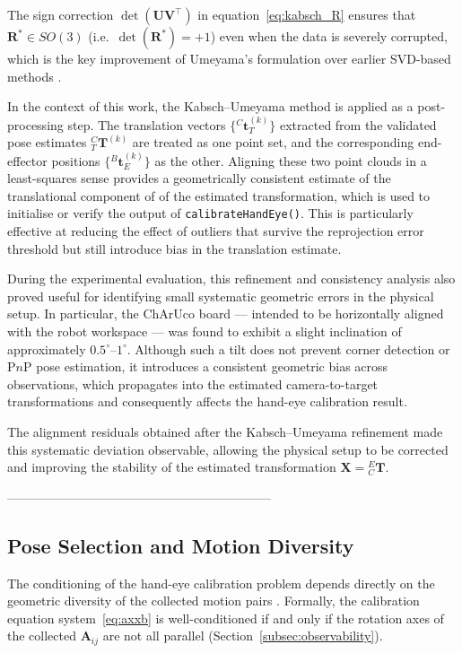 \noindent The sign correction $\det(\mathbf{U}\mathbf{V}^{\top})$ in
equation~\eqref{eq:kabsch_R} ensures that $\mathbf{R}^* \in SO(3)$ (i.e.\
$\det(\mathbf{R}^*) = +1$) even when the data is severely corrupted, which
is the key improvement of Umeyama's formulation over earlier SVD-based methods
\cite{umeyama1991least}.

In the context of this work, the Kabsch--Umeyama method is applied as a
post-processing step. The translation vectors
$\{{}^C\mathbf{t}_T^{(k)}\}$ extracted from the validated pose estimates
${}^C_T\mathbf{T}^{(k)}$ are treated as one point set, and the corresponding
end-effector positions $\{{}^B\mathbf{t}_E^{(k)}\}$ as the other. Aligning
these two point clouds in a least-squares sense provides a geometrically
consistent estimate of the translational component of of the estimated transformation, which
is used to initialise or verify the output of \texttt{calibrateHandEye()}.
This is particularly effective at reducing the effect of outliers that survive
the reprojection error threshold but still introduce bias in the translation
estimate.


During the experimental evaluation, this refinement and consistency analysis
also proved useful for identifying small systematic geometric errors in the
physical setup. In particular, the ChArUco board — intended to be horizontally
aligned with the robot workspace — was found to exhibit a slight inclination
of approximately $0.5^\circ$--$1^\circ$. Although such a tilt does not prevent
corner detection or P$n$P pose estimation, it introduces a consistent geometric
bias across observations, which propagates into the estimated camera-to-target
transformations and consequently affects the hand-eye calibration result.

The alignment residuals obtained after the Kabsch--Umeyama refinement made
this systematic deviation observable, allowing the physical setup to be
corrected and improving the stability of the estimated transformation
$\mathbf{X} = {}^E_C\mathbf{T}$.

 ---------------------------------------------------------------
\subsection{Pose Selection and Motion Diversity}
\label{subsec:pose_selection}

The conditioning of the hand-eye calibration problem depends directly on the
geometric diversity of the collected motion pairs
\cite{strobl2006optimal, park1994robot}. Formally, the calibration equation
system~\eqref{eq:axxb} is well-conditioned if and only if the rotation axes of
the collected $\mathbf{A}_{ij}$ are not all parallel
(Section~\ref{subsec:observability}).

